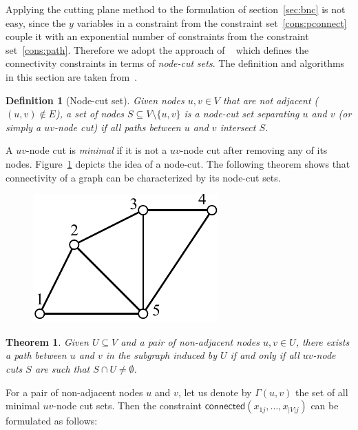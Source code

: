 \documentclass[conference,compsoc]{IEEEtran}
\newtheorem{theorem}{Theorem}
\newtheorem{definition}{Definition}
\begin{document}
 Applying the cutting plane method to the formulation of section~\ref{sec:bnc} is not easy, since the $y$ variables in a constraint from the constraint set~\ref{cons:pconnect} couple it with an exponential number of constraints from the constraint set~\ref{cons:path}. Therefore we adopt the approach of ~\cite{CarvajalCGVW13} which defines the connectivity constraints in terms of \emph{node-cut sets}. The definition and algorithms in this section are taken from~\cite{CarvajalCGVW13}.

\begin{definition}[Node-cut set]
Given nodes $u, v \in V$ that are not adjacent ($(u, v) \notin E$), a set of nodes $S \subseteq V \setminus \{u, v\}$ is a \emph{node-cut set} separating $u$ and $v$ (or simply a \emph{$uv$-node cut}) if all paths between $u$ and $v$ intersect $S$.
\end{definition}

A $uv$-node cut is \emph{minimal} if it is not a $uv$-node cut after removing any of its nodes. Figure~\ref{fig:cutset} depicts the idea of a node-cut. The following theorem shows that connectivity of a graph can be characterized by its node-cut sets. 

\begin{figure}
\centering
\includegraphics[scale=0.7]{images/cutset}
\captionsetup{font=small}
\label{fig:cutset}
\end{figure}

\begin{theorem}
Given $U \subseteq V$ and a pair of non-adjacent nodes $u, v \in U$, there exists a path between $u$ and $v$ in the subgraph induced by $U$ if and only if all $uv$-node cuts $S$ are such that $S \cap U \neq \emptyset$.
\label{theorem:cutset}
\end{theorem}

For a pair of non-adjacent nodes $u$ and $v$, let us denote by $\Gamma(u, v)$ the set of all minimal $uv$-node cut sets. Then the constraint $\mathsf{connected}(x_{1j}, \ldots, x_{|V|j})$ can be formulated as follows:
\end{document}

